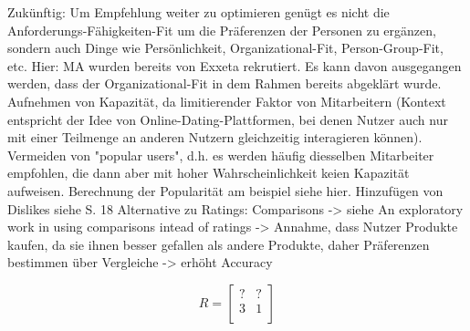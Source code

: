 Zukünftig:
Um Empfehlung weiter zu optimieren genügt es nicht die Anforderungs-Fähigkeiten-Fit um die Präferenzen der Personen zu ergänzen, sondern auch Dinge wie Persönlichkeit, Organizational-Fit, Person-Group-Fit, etc.
Hier: MA wurden bereits von Exxeta rekrutiert. Es kann davon ausgegangen werden, dass der Organizational-Fit in dem Rahmen bereits abgeklärt wurde.
Aufnehmen von Kapazität, da limitierender Faktor von Mitarbeitern (Kontext entspricht der Idee von Online-Dating-Plattformen, bei denen Nutzer auch nur mit einer Teilmenge an anderen Nutzern gleichzeitig interagieren können). %
Vermeiden von "popular users", d.h. es werden häufig diesselben Mitarbeiter empfohlen, die dann aber mit hoher Wahrscheinlichkeit keien Kapazität aufweisen. Berechnung der Popularität am beispiel siehe hier. %
Hinzufügen von Dislikes siehe S. 18 %
Alternative zu Ratings: Comparisons -> siehe An exploratory work in using comparisons intead of ratings -> Annahme, dass Nutzer Produkte kaufen, da sie ihnen besser gefallen als andere Produkte, daher Präferenzen bestimmen über Vergleiche -> erhöht Accuracy %


$$
R=\begin{bmatrix}
    ? & ? \\
    3 & 1 \\
\end{bmatrix}
$$\\


